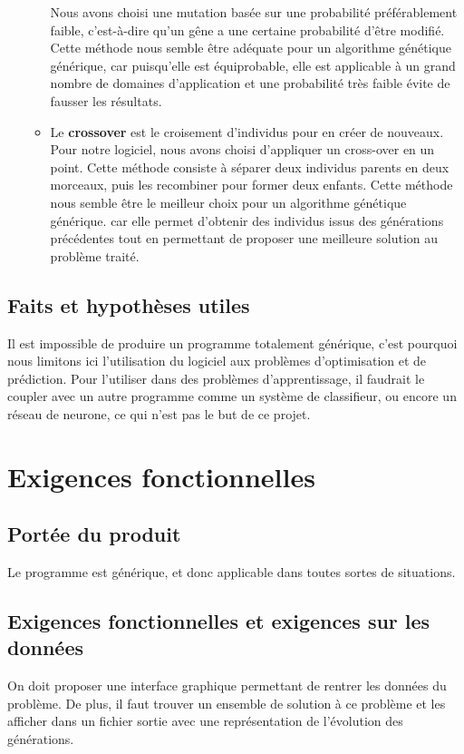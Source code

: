 \documentclass[a4paper,11pt]{article}
\begin{document}
\begin{itemize}
\begin{itemize}
				Nous avons choisi une mutation basée sur une probabilité préférablement faible, c'est-à-dire qu'un gêne a une certaine probabilité d'être modifié. 
				Cette méthode nous semble être adéquate pour un algorithme génétique générique, car puisqu’elle est équiprobable, elle est applicable à un grand nombre de domaines d’application et une probabilité très faible 
				évite de fausser les résultats.
				\item Le \textbf{crossover} est le croisement d'individus pour en créer de nouveaux.
				Pour notre logiciel, nous avons choisi d’appliquer un cross-over en un point. 
				Cette méthode consiste à séparer deux individus parents en deux morceaux, puis les recombiner pour former deux enfants.
				Cette méthode nous semble être le meilleur choix pour un algorithme génétique générique. 
				car elle permet d’obtenir des individus issus des générations précédentes tout en permettant de proposer une meilleure solution au problème traité.
				
				

				

				
				\end{itemize}
			\end{itemize}
			
		\subsection{Faits et hypothèses utiles}
			Il est impossible de produire un programme totalement générique, c’est pourquoi nous limitons ici l’utilisation du logiciel aux problèmes d’optimisation et de prédiction. 
			Pour l’utiliser dans des problèmes d’apprentissage, il faudrait le coupler avec un autre programme comme un système de classifieur, ou encore un réseau de neurone, ce qui n’est pas le but de ce projet.
	\section{Exigences fonctionnelles}
		\subsection{Portée du produit}
			Le programme est générique, et donc applicable dans toutes sortes de situations.
		\subsection{Exigences fonctionnelles et exigences sur les données}
			On doit proposer une interface graphique permettant de rentrer les données du problème. De plus, il faut trouver un ensemble de solution à ce problème et les afficher dans un fichier sortie avec une représentation de l’évolution des générations.
			
\end{document}
